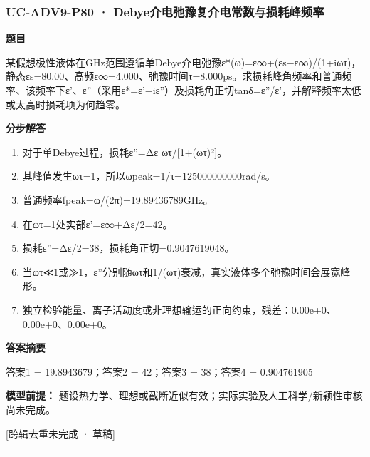 \documentclass[UTF8,11pt,a4paper]{ctexart}
\begin{document}
\subsubsection*{UC-ADV9-P80 · Debye介电弛豫复介电常数与损耗峰频率}
\noindent\textbf{题目}\par
某假想极性液体在GHz范围遵循单Debye介电弛豫ε*(ω)=ε∞+(εs−ε∞)/(1+iωτ)，静态εs=80.00、高频ε∞=4.000、弛豫时间τ=8.000ps。求损耗峰角频率和普通频率、该频率下ε'、ε''（采用ε*=ε'−iε''）及损耗角正切tanδ=ε''/ε'，并解释频率太低或太高时损耗项为何趋零。\par
\medskip\noindent\textbf{分步解答}
\begin{enumerate}
\item 对于单Debye过程，损耗ε''=Δε ωτ/[1+(ωτ)²]。
\item 其峰值发生ωτ=1，所以ωpeak=1/τ=125000000000rad/s。
\item 普通频率fpeak=ω/(2π)=19.89436789GHz。
\item 在ωτ=1处实部ε'=ε∞+Δε/2=42。
\item 损耗ε''=Δε/2=38，损耗角正切=0.9047619048。
\item 当ωτ≪1或≫1，ε''分别随ωτ和1/(ωτ)衰减，真实液体多个弛豫时间会展宽峰形。
\item 独立检验能量、离子活动度或非理想输运的正向约束，残差：0.00e+0、0.00e+0、0.00e+0。
\end{enumerate}
\noindent\textbf{答案摘要}\par
答案1 = 19.8943679；答案2 = 42；答案3 = 38；答案4 = 0.904761905\par
\noindent\textbf{模型前提：}
题设热力学、理想或截断近似有效；实际实验及人工科学/新颖性审核尚未完成。\par
\noindent\textcolor{red!65!black}{[跨辑去重未完成 · 草稿]} \par
\medskip\hrule\medskip
{}
\end{document}
